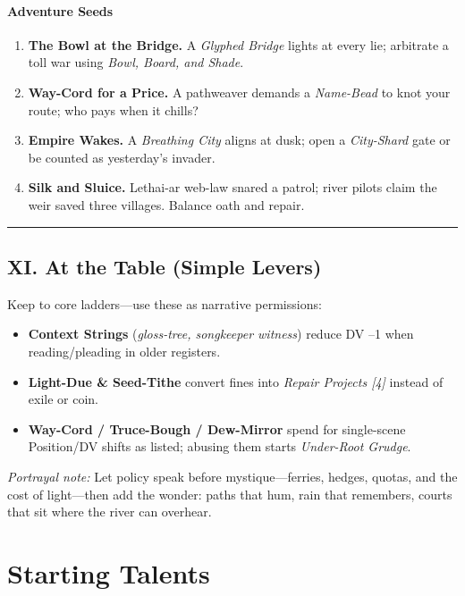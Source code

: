\documentclass[11pt]{article}
\begin{document}
\paragraph{Adventure Seeds}
\begin{enumerate}[leftmargin=*]
  \item \textbf{The Bowl at the Bridge.} A \emph{Glyphed Bridge} lights at every lie; arbitrate a toll war using \emph{Bowl, Board, and Shade}.
  \item \textbf{Way-Cord for a Price.} A pathweaver demands a \emph{Name-Bead} to knot your route; who pays when it chills?
  \item \textbf{Empire Wakes.} A \emph{Breathing City} aligns at dusk; open a \emph{City-Shard} gate or be counted as yesterday's invader.
  \item \textbf{Silk and Sluice.} Lethai-ar web-law snared a patrol; river pilots claim the weir saved three villages. Balance oath and repair.
\end{enumerate}

\medskip\hrule\medskip

\subsection{XI. At the Table (Simple Levers)}
Keep to core ladders---use these as narrative permissions:
\begin{itemize}[leftmargin=*]
  \item \textbf{Context Strings} (\emph{gloss-tree, songkeeper witness}) reduce DV --1 when reading/pleading in older registers.
  \item \textbf{Light-Due \& Seed-Tithe} convert fines into \emph{Repair Projects [4]} instead of exile or coin.
  \item \textbf{Way-Cord / Truce-Bough / Dew-Mirror} spend for single-scene Position/DV shifts as listed; abusing them starts \emph{Under-Root Grudge}.
\end{itemize}

\textit{Portrayal note:} Let policy speak before mystique---ferries, hedges, quotas, and the cost of light---then add the wonder: paths that hum, rain that remembers, courts that sit where the river can overhear.

\section*{Starting Talents}
\end{document}
